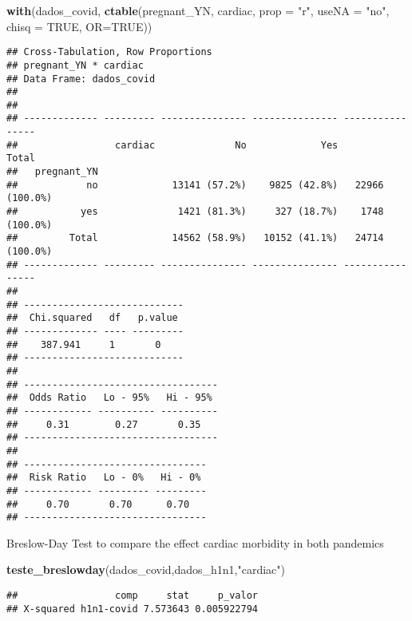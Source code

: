 \documentclass[
]{article}
\newenvironment{Shaded}{\begin{snugshade}}{\end{snugshade}}
\newcommand{\DataTypeTok}[1]{\textcolor[rgb]{0.13,0.29,0.53}{#1}}
\newcommand{\KeywordTok}[1]{\textcolor[rgb]{0.13,0.29,0.53}{\textbf{#1}}}
\newcommand{\NormalTok}[1]{#1}
\newcommand{\OtherTok}[1]{\textcolor[rgb]{0.56,0.35,0.01}{#1}}
\newcommand{\StringTok}[1]{\textcolor[rgb]{0.31,0.60,0.02}{#1}}
\begin{document}
\begin{Shaded}
\begin{Highlighting}[]
\KeywordTok{with}\NormalTok{(dados_covid, }\KeywordTok{ctable}\NormalTok{(pregnant_YN, cardiac, }\DataTypeTok{prop =} \StringTok{"r"}\NormalTok{, }\DataTypeTok{useNA =} \StringTok{"no"}\NormalTok{, }\DataTypeTok{chisq =} \OtherTok{TRUE}\NormalTok{, }\DataTypeTok{OR=}\OtherTok{TRUE}\NormalTok{))}
\end{Highlighting}
\end{Shaded}

\begin{verbatim}
## Cross-Tabulation, Row Proportions  
## pregnant_YN * cardiac  
## Data Frame: dados_covid  
## 
## 
## ------------- --------- --------------- --------------- ----------------
##                 cardiac              No             Yes            Total
##   pregnant_YN                                                           
##            no             13141 (57.2%)    9825 (42.8%)   22966 (100.0%)
##           yes              1421 (81.3%)     327 (18.7%)    1748 (100.0%)
##         Total             14562 (58.9%)   10152 (41.1%)   24714 (100.0%)
## ------------- --------- --------------- --------------- ----------------
## 
## ----------------------------
##  Chi.squared   df   p.value 
## ------------- ---- ---------
##    387.941     1       0    
## ----------------------------
## 
## ----------------------------------
##  Odds Ratio   Lo - 95%   Hi - 95% 
## ------------ ---------- ----------
##     0.31        0.27       0.35   
## ----------------------------------
## 
## --------------------------------
##  Risk Ratio   Lo - 0%   Hi - 0% 
## ------------ --------- ---------
##     0.70       0.70      0.70   
## --------------------------------
\end{verbatim}

Breslow-Day Test to compare the effect cardiac morbidity in both
pandemics

\begin{Shaded}
\begin{Highlighting}[]
\KeywordTok{teste_breslowday}\NormalTok{(dados_covid,dados_h1n1,}\StringTok{"cardiac"}\NormalTok{)}
\end{Highlighting}
\end{Shaded}

\begin{verbatim}
##                 comp     stat     p_valor
## X-squared h1n1-covid 7.573643 0.005922794
\end{verbatim}
\end{document}
